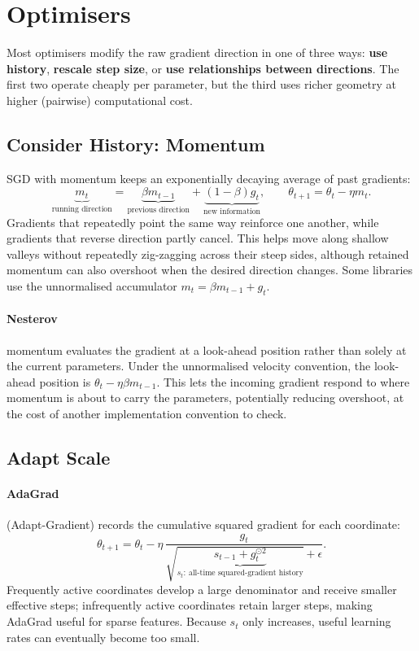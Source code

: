 \section{Optimisers}

Most optimisers modify the raw gradient direction in one of three ways: \textbf{use history}, \textbf{rescale step size}, or \textbf{use relationships between directions}.
The first two operate cheaply per parameter, but the third uses richer geometry at higher (pairwise) computational cost.

\subsection{Consider History: Momentum}
\label{sec:optimisation-momentum-remember-previous-gradient-directions}
SGD with momentum keeps an exponentially decaying average of past gradients:
\[
    \underbrace{m_t}_{\text{running direction}}
    =
    \underbrace{\beta m_{t-1}}_{\text{previous direction}}
    +
    \underbrace{(1-\beta)g_t}_{\text{new information}},
    \qquad
    \theta_{t+1}=\theta_t-\eta m_t.
\]
Gradients that repeatedly point the same way reinforce one another, while gradients that reverse direction partly cancel.
This helps move along shallow valleys without repeatedly zig-zagging across their steep sides, although retained momentum can also overshoot when the desired direction changes.
Some libraries use the unnormalised accumulator $m_t=\beta m_{t-1}+g_t$.

\paragraph{Nesterov} momentum evaluates the gradient at a look-ahead position rather than solely at the current parameters.
Under the unnormalised velocity convention, the look-ahead position is $\theta_t-\eta\beta m_{t-1}$.
This lets the incoming gradient respond to where momentum is about to carry the parameters, potentially reducing overshoot, at the cost of another implementation convention to check.

\subsection{Adapt Scale}
\label{sec:optimisation-adagrad-and-rmsprop-coordinate-wise-adaptation}
\paragraph{AdaGrad} (Adapt-Gradient) records the cumulative squared gradient for each coordinate:
\[
    \theta_{t+1}
    =
    \theta_t-\eta\,
    \frac{g_t}{
    \sqrt{\underbrace{s_{t-1}+g_t^{\odot2}}_{s_t:\ \text{all-time squared-gradient history}}}
    +\epsilon}.
\]
Frequently active coordinates develop a large denominator and receive smaller effective steps; infrequently active coordinates retain larger steps, making AdaGrad useful for sparse features.
Because $s_t$ only increases, useful learning rates can eventually become too small.

